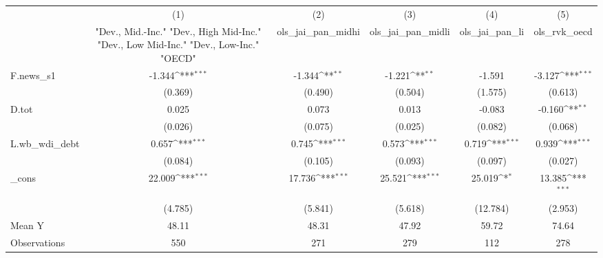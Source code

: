 {
\def\sym#1{\ifmmode^{#1}\else\(^{#1}\)\fi}
\begin{tabular}{l*{5}{c}}
\toprule
            &\multicolumn{1}{c}{(1)}&\multicolumn{1}{c}{(2)}&\multicolumn{1}{c}{(3)}&\multicolumn{1}{c}{(4)}&\multicolumn{1}{c}{(5)}\\
            &\multicolumn{1}{c}{ "Dev., Mid.-Inc." "Dev., High Mid-Inc." "Dev., Low Mid-Inc." "Dev., Low-Inc." "OECD" }&\multicolumn{1}{c}{ols\_jai\_pan\_midhi}&\multicolumn{1}{c}{ols\_jai\_pan\_midli}&\multicolumn{1}{c}{ols\_jai\_pan\_li}&\multicolumn{1}{c}{ols\_rvk\_oecd}\\
\midrule
F.news\_s1   &      -1.344\sym{***}&      -1.344\sym{**} &      -1.221\sym{**} &      -1.591         &      -3.127\sym{***}\\
            &     (0.369)         &     (0.490)         &     (0.504)         &     (1.575)         &     (0.613)         \\
\addlinespace
D.tot       &       0.025         &       0.073         &       0.013         &      -0.083         &      -0.160\sym{**} \\
            &     (0.026)         &     (0.075)         &     (0.025)         &     (0.082)         &     (0.068)         \\
\addlinespace
L.wb\_wdi\_debt&       0.657\sym{***}&       0.745\sym{***}&       0.573\sym{***}&       0.719\sym{***}&       0.939\sym{***}\\
            &     (0.084)         &     (0.105)         &     (0.093)         &     (0.097)         &     (0.027)         \\
\addlinespace
\_cons      &      22.009\sym{***}&      17.736\sym{***}&      25.521\sym{***}&      25.019\sym{*}  &      13.385\sym{***}\\
            &     (4.785)         &     (5.841)         &     (5.618)         &    (12.784)         &     (2.953)         \\
\midrule
Mean Y      &       48.11         &       48.31         &       47.92         &       59.72         &       74.64         \\
Observations&         550         &         271         &         279         &         112         &         278         \\
\bottomrule
\end{tabular}
}
